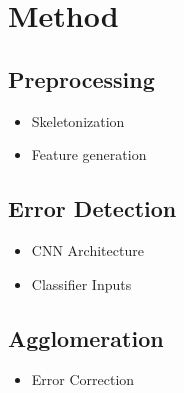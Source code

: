\section{Method}

\subsection{Preprocessing}

\begin{itemize}
	\item Skeletonization
	\item Feature generation
\end{itemize}

\subsection{Error Detection}

\begin{itemize}
	\item CNN Architecture
	\item Classifier Inputs
\end{itemize}

\subsection{Agglomeration}

\begin{itemize}
	\item Error Correction
\end{itemize}
